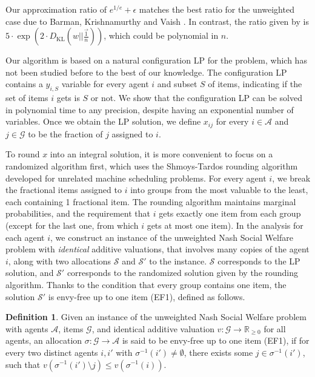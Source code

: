 \documentclass[10pt,a4paper]{article}
\theoremstyle{definition}
\newtheorem{definition}[theorem]{Definition}
\theoremstyle{plain}
\newcommand\calS{{\mathcal{S}}}
\newcommand\calA{{\mathcal{A}}}
\newcommand\calG{{\mathcal{G}}}
\newcommand{\R}{{\mathbb{R}}}
\begin{document}
Our approximation ratio of $e^{1/e} + \epsilon$ matches the best ratio for the unweighted case due to Barman, Krishnamurthy and Vaish \cite{BKV18}.  In contrast, the ratio given by \cite{BLP24} is $5\cdot \exp(2 \cdot D_{\text{KL}}(w || \frac{\vec{1}}{n}))$, which could be polynomial in $n$. 
%

Our algorithm is based on a natural configuration LP for the problem, which has not been studied before to the best of our knowledge.  The configuration LP contains a $y_{i, S}$ variable for every agent $i$ and subset $S$ of items, indicating if the set of items $i$ gets is $S$ or not. We show that the configuration LP can be solved in polynomial time to any precision, despite having an exponential number of variables.  Once we obtain the LP solution, we define $x_{ij}$ for every $i \in \calA$ and $j \in \calG$ to be the fraction of $j$ assigned to $i$. 

To round $x$ into an integral solution, it is more convenient to focus on a randomized algorithm first, which uses the Shmoys-Tardos rounding algorithm \cite{ST93} developed for unrelated machine scheduling problems. 
For every agent $i$, we break the fractional items assigned to $i$ into groups from the most valuable to the least, each containing 1 fractional item. The rounding algorithm maintains marginal probabilities, and the requirement that $i$ gets exactly one item from each group (except for the last one, from which $i$ gets at most one item).  In the analysis for each agent $i$, we construct an instance of the unweighted Nash Social Welfare problem with \emph{identical} additive valuations, that involves many copies of the agent $i$, along with two allocations $\calS$ and $\calS'$ to the instance. $\calS$ corresponds to the LP solution, and $\calS'$ corresponds to the randomized solution given by the rounding algorithm. Thanks to the condition that every group contains one item, the solution $\calS'$ is envy-free up to one item (EF1), defined as follows.
    \begin{definition}
        Given an instance of the unweighted Nash Social Welfare problem with agents $\calA$, items $\calG$, and identical additive valuation $v: \calG \to \R_{\geq 0}$ for all agents, an allocation $\sigma: \calG \to \calA$ is said to be envy-free up to one item (EF1),  if for every two distinct agents $i, i'$ with $\sigma^{-1}(i') \neq \emptyset$, there exists some $j \in \sigma^{-1}(i')$, such that $v(\sigma^{-1}(i') \setminus j) \leq v(\sigma^{-1}(i))$.
    \end{definition}
\end{document}

